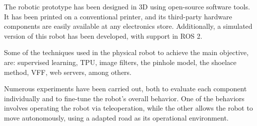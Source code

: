 The robotic prototype has been designed in 3D using open-source software tools. It has been printed on a conventional printer, and its third-party hardware components are easily available at any electronics store. Additionally, a simulated version of this robot has been developed, with support in ROS 2.


Some of the techniques used in the physical robot to achieve the main objective, are: supervised learning, \ac{TPU}, image filters, the pinhole model, the shoelace method, \ac{VFF}, web servers, among others.


Numerous experiments have been carried out, both to evaluate each component individually and to fine-tune the robot's overall behavior. One of the behaviors involves operating the robot via teleoperation, while the other allows the robot to move autonomously, using a adapted road as its operational environment. 
